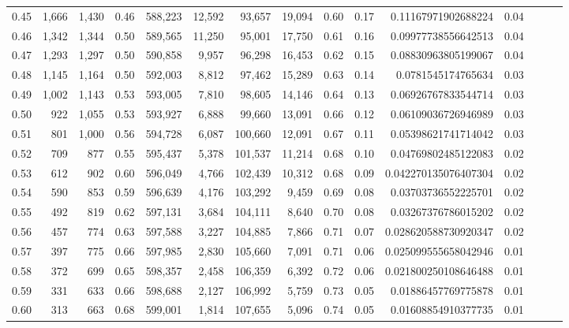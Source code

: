 \begin{tabular}{rrrrrrrrrrrrrrr}
0.45 &   1,666 &  1,430 &  0.46 &  588,223 &   12,592 &   93,657 &   19,094 &  0.60 &  0.17 &     0.11167971902688224 &      0.04 \\
0.46 &   1,342 &  1,344 &  0.50 &  589,565 &   11,250 &   95,001 &   17,750 &  0.61 &  0.16 &     0.09977738556642513 &      0.04 \\
0.47 &   1,293 &  1,297 &  0.50 &  590,858 &    9,957 &   96,298 &   16,453 &  0.62 &  0.15 &     0.08830963805199067 &      0.04 \\
0.48 &   1,145 &  1,164 &  0.50 &  592,003 &    8,812 &   97,462 &   15,289 &  0.63 &  0.14 &      0.0781545174765634 &      0.03 \\
0.49 &   1,002 &  1,143 &  0.53 &  593,005 &    7,810 &   98,605 &   14,146 &  0.64 &  0.13 &     0.06926767833544714 &      0.03 \\
0.50 &     922 &  1,055 &  0.53 &  593,927 &    6,888 &   99,660 &   13,091 &  0.66 &  0.12 &     0.06109036726946989 &      0.03 \\
0.51 &     801 &  1,000 &  0.56 &  594,728 &    6,087 &  100,660 &   12,091 &  0.67 &  0.11 &     0.05398621741714042 &      0.03 \\
0.52 &     709 &    877 &  0.55 &  595,437 &    5,378 &  101,537 &   11,214 &  0.68 &  0.10 &     0.04769802485122083 &      0.02 \\
0.53 &     612 &    902 &  0.60 &  596,049 &    4,766 &  102,439 &   10,312 &  0.68 &  0.09 &    0.042270135076407304 &      0.02 \\
0.54 &     590 &    853 &  0.59 &  596,639 &    4,176 &  103,292 &    9,459 &  0.69 &  0.08 &     0.03703736552225701 &      0.02 \\
0.55 &     492 &    819 &  0.62 &  597,131 &    3,684 &  104,111 &    8,640 &  0.70 &  0.08 &     0.03267376786015202 &      0.02 \\
0.56 &     457 &    774 &  0.63 &  597,588 &    3,227 &  104,885 &    7,866 &  0.71 &  0.07 &    0.028620588730920347 &      0.02 \\
0.57 &     397 &    775 &  0.66 &  597,985 &    2,830 &  105,660 &    7,091 &  0.71 &  0.06 &    0.025099555658042946 &      0.01 \\
0.58 &     372 &    699 &  0.65 &  598,357 &    2,458 &  106,359 &    6,392 &  0.72 &  0.06 &    0.021800250108646488 &      0.01 \\
0.59 &     331 &    633 &  0.66 &  598,688 &    2,127 &  106,992 &    5,759 &  0.73 &  0.05 &     0.01886457769775878 &      0.01 \\
0.60 &     313 &    663 &  0.68 &  599,001 &    1,814 &  107,655 &    5,096 &  0.74 &  0.05 &     0.01608854910377735 &      0.01 \\

\end{tabular}
